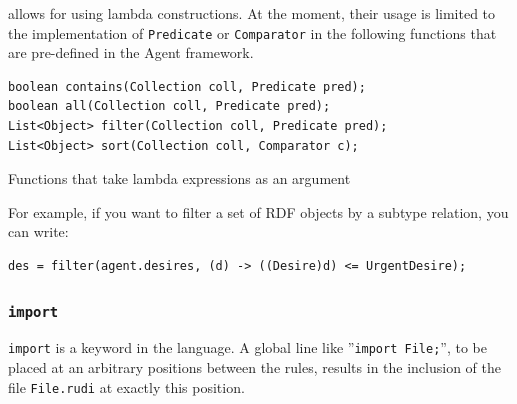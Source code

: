 \vonda allows for using lambda constructions. At the moment, their usage is limited to the implementation of \texttt{Predicate} or \texttt{Comparator} in the following functions that are pre-defined in the Agent framework.

\begin{table}[htbp]
  \centering
  \begin{small}
\begin{verbatim}
boolean contains(Collection coll, Predicate pred);
boolean all(Collection coll, Predicate pred);
List<Object> filter(Collection coll, Predicate pred);
List<Object> sort(Collection coll, Comparator c);
\end{verbatim}
  \end{small}

  \caption{Functions that take lambda expressions as an argument}
  \label{tab:lambda-functions}
\end{table}

For example, if you want to filter a set of RDF objects by a subtype relation, you can write:

\begin{verbatim}
des = filter(agent.desires, (d) -> ((Desire)d) <= UrgentDesire);
\end{verbatim}

\subsubsection{\texttt{import}}

%
\texttt{import} is a keyword in the \vonda language. A global line like ''\texttt{import File;}'', to be placed at an arbitrary positions between the rules, results in the inclusion of the file \texttt{File.rudi} at exactly this position.


